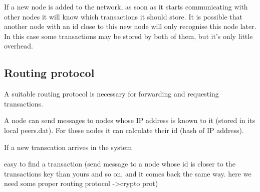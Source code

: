 \documentclass[a4paper,12pt]{article}
\begin{document}
If a new node is added to the network, as soon as it starts communicating with other nodes it will know which transactions it should store. It is possible that another node with an id close to this new node will only recognise this node later. In this case some transactions may be stored by both of them, but it's only  little overhead.



\subsection{Routing protocol}

A suitable routing protocol is necessary for forwarding and requesting transactions.

A node can send messages to nodes whose IP address is known to it (stored in its local peers.dat). For these nodes it can calculate their id (hash of IP address).

If a new transcation arrives in the system 

easy to find a transaction (send message to a node whose id is closer to the transactions key than yours and so on, and it comes back the same way. here we need some proper routing protocol ->crypto prot)

\end{document}
